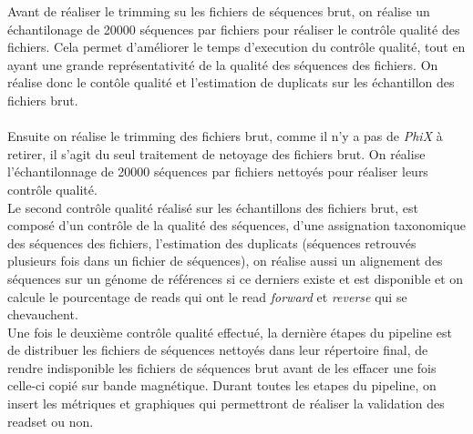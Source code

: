 Avant de réaliser le trimming su les fichiers de séquences brut, on réalise un échantilonage de 20000 séquences par fichiers pour réaliser le contrôle qualité des fichiers. Cela permet d'améliorer le temps d'execution du contrôle qualité, tout en ayant une grande représentativité de la qualité des séquences des fichiers. On réalise donc le contôle qualité et l'estimation de duplicats sur les échantillon des fichiers brut.\\\\

Ensuite on réalise le trimming des fichiers brut, comme il n'y a pas de \emph{PhiX} à retirer, il s'agit du seul traitement de netoyage des fichiers brut. On réalise l'échantilonnage de 20000 séquences par fichiers nettoyés pour réaliser leurs contrôle qualité.\\

Le second contrôle qualité réalisé sur les échantillons des fichiers brut, est composé d'un contrôle de la qualité des séquences, d'une assignation taxonomique des séquences des fichiers, l'estimation des duplicats (séquences retrouvés plusieurs fois dans un fichier de séquences), on réalise aussi un alignement des séquences sur un génome de références si ce derniers existe et est disponible et on calcule le pourcentage de reads qui ont le read \emph{forward} et \emph{reverse} qui se chevauchent.\\

Une fois le deuxième contrôle qualité effectué, la dernière étapes du pipeline est de distribuer les fichiers de séquences nettoyés dans leur répertoire final, de rendre indisponible les fichiers de séquences brut avant de les effacer une fois celle-ci copié sur bande magnétique. Durant toutes les etapes du pipeline, on insert les métriques et graphiques qui permettront de réaliser la validation des readset ou non.